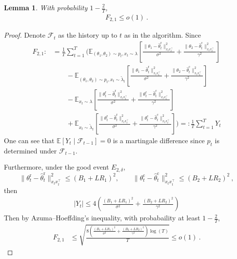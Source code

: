 \documentclass[accepted]{uai2025} %
\theoremstyle{plain}
\newtheorem{lemma}[theorem]{Lemma}
\theoremstyle{definition}
\theoremstyle{remark}
\newcommand{\hthetact}{\hat{\theta}_t^{\mathrm{c}}}
\newcommand{\hthetart}{\hat{\theta}_t^{\mathrm{r}}}
\newcommand{\EE}{\mathbb{E}} %
\begin{document}
\begin{lemma}
\label{lem:Regret_F21}
With probability $1-\frac{2}{T}$,
    \begin{align*}
        F_{2,1}\le o(1)~.
    \end{align*}
\end{lemma}
\begin{proof}
    Denote $\mathcal{F}_t$ as the history up to $t$ as in the algorithm. Since 
\begin{align*}
    F_{2,1}:&=\frac{1}{T} 
\sum_{t=1}^{T} \Bigg( \mathbb{E}_{(\theta_1, \theta_2) \sim p_t, x_t\sim \lambda} 
\left[ \frac{\|\theta_1 - \hthetart\|_{x_t x_t^\top}^2}{\sigma^2} 
+ \frac{\|\theta_2 - \hthetact\|_{x_t x_t^\top}^2}{\gamma^2}  \right] \\
&\qquad- \mathbb{E}_{(\theta_1, \theta_2) \sim p_t, x_t\sim \tilde{\lambda}_t} 
\left[ \frac{\|\theta_1 - \hthetart\|_{x_t x_t^\top}^2}{\sigma^2} 
+ \frac{\|\theta_2 - \hthetact\|_{x_t x_t^\top}^2}{\gamma^2}  \right] \\
 &\qquad-\mathbb{E}_{ x_t\sim \lambda} 
\left[ \frac{\|\theta_t^\mathrm{r} - \hthetart\|_{x_t x_t^\top}^2}{\sigma^2} 
 + \frac{\|\theta_t^\mathrm{c} - \hthetact\|_{x_t x_t^\top}^2}{\gamma^2}  \right]  \\
&\qquad+ \mathbb{E}_{ x_t\sim \tilde{\lambda}_t} 
\left[\frac{\|\theta_t^\mathrm{r} - \hthetart\|_{x_t x_t^\top}^2}{\sigma^2} 
+ \frac{\|\theta_t^\mathrm{c} - \hthetact\|_{x_t x_t^\top}^2}{\gamma^2} \right] \Bigg)  =:\frac{1}{T} 
\sum_{t=1}^{T}  Y_t
\end{align*}
One can see that $\EE[Y_t \mid \mathcal{F}_{t-1}]=0$ is a martingale difference since $p_t$ is determined under $\mathcal{F}_{t-1}$. 

Furthermore, under the good event $E_{2,\delta}$, $$\|\theta_t^\mathrm{r} - \hthetart\|_{x_t x_t^\top}^2\le (B_1+LR_1)^2, \qquad\|\theta_t^\mathrm{c} - \hthetact\|_{x_t x_t^\top}^2\le (B_2+LR_2)^2~,$$ then 
\begin{align*}
    \lvert Y_t\rvert\le 4 \left(\frac{(B_1+LR_1)^2}{\sigma^2}+\frac{(B_2+LR_2)^2}{\gamma^2} \right)
\end{align*}
Then by Azuma--Hoeffding's inequality, with probabaility at least $1-\frac{2}{T}$, 
\begin{align*}
    F_{2,1} &\le \sqrt{\frac{8(\frac{(B_1+LR_1)^2}{\sigma^2}+\frac{(B_2+LR_2)^2}{\gamma^2}) \log(T)}{T}}
     \le o(1)~.
\end{align*}

\end{proof}
\end{document}
